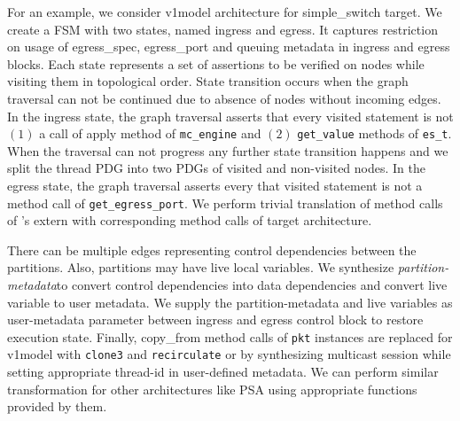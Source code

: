 \documentclass[letterpaper,twocolumn,10pt]{article}
\begin{document}
For an example, we consider v1model architecture for simple\_switch target.
We create a FSM with two states, named ingress and egress.
It captures restriction on usage of egress\_spec, egress\_port and queuing metadata in ingress and egress blocks.
Each state represents a set of assertions to be verified on nodes while visiting them in topological order.
State transition occurs when the graph traversal can not be continued due to absence of nodes without incoming edges.
In the ingress state, the graph traversal asserts that every visited statement is not $(1)$ a call of apply method of \texttt{mc\_engine}  and $(2)$ \texttt{get\_value} methods of \texttt{es\_t}.
When the traversal can not progress any further state transition happens and we split the thread PDG into two PDGs of visited and non-visited nodes.
In the egress state, the graph traversal asserts every that visited statement is not a method call of \texttt{get\_egress\_port}.
We perform trivial translation of method calls of \uarch's extern with corresponding method calls of target architecture.

There can be multiple edges representing control dependencies between the partitions.
Also, partitions may have live local variables.
We synthesize \emph{partition-metadata}to convert control dependencies into data dependencies and convert live variable to user metadata.
We supply the partition-metadata and live variables as user-metadata parameter between ingress and egress control block to restore execution state.
Finally, {copy\_from} method calls of \texttt{pkt} instances are replaced for v1model with \texttt{clone3} and \texttt{recirculate} or by synthesizing multicast session while setting appropriate thread-id in user-defined metadata.
We can perform similar transformation for other architectures like PSA using appropriate functions provided by them.



\end{document}
